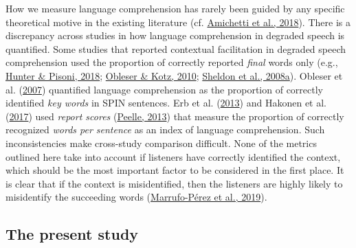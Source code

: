 \documentclass[a4paper, nobind]{templates/ociamthesis}
\begin{document}
How we measure language comprehension has rarely been guided by any specific theoretical motive in the existing literature (cf. \protect\hyperlink{ref-Amichetti2018}{Amichetti et al., 2018}).
There is a discrepancy across studies in how language comprehension in degraded speech is quantified.
Some studies that reported contextual facilitation in degraded speech comprehension used the proportion of correctly reported \emph{final} words only (e.g., \protect\hyperlink{ref-Hunter2018}{Hunter \& Pisoni, 2018}; \protect\hyperlink{ref-Obleser2010}{Obleser \& Kotz, 2010}; \protect\hyperlink{ref-Sheldon2008a}{Sheldon et al., 2008a}).
Obleser et al. (\protect\hyperlink{ref-Obleser2007}{2007}) quantified language comprehension as the proportion of correctly identified \emph{key words} in SPIN sentences.
Erb et al. (\protect\hyperlink{ref-Erb2013}{2013}) and Hakonen et al. (\protect\hyperlink{ref-Hakonen2017}{2017}) used \emph{report scores} (\protect\hyperlink{ref-Peelle2013}{Peelle, 2013}) that measure the proportion of correctly recognized \emph{words per sentence} as an index of language comprehension.
Such inconsistencies make cross-study comparison difficult.
None of the metrics outlined here take into account if listeners have correctly identified the context, which should be the most important factor to be considered in the first place.
It is clear that if the context is misidentified, then the listeners are highly likely to misidentify the succeeding words (\protect\hyperlink{ref-Marrufo2019}{Marrufo-Pérez et al., 2019}).

\hypertarget{the-present-study}{%
\subsection{The present study}\label{the-present-study}}
\end{document}
